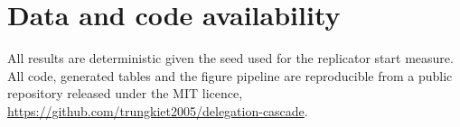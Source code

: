 \documentclass[11pt,a4paper]{article}
\theoremstyle{definition}
\begin{document}
\section*{Data and code availability}

All results are deterministic given the seed used for the replicator start
measure. All code, generated tables and the figure pipeline are reproducible
from a public repository released under the MIT licence,
\sloppy\url{https://github.com/trungkiet2005/delegation-cascade}.



\end{document}
